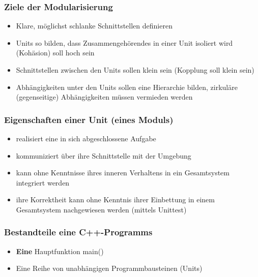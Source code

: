 \subsubsection{Ziele der Modularisierung\hfill}
\label{sec:Ziele der Modularisierung}
\begin{itemize}
	\item Klare, möglichst schlanke Schnittstellen definieren
	\item Units so bilden, dass Zusammengehörendes in einer Unit isoliert wird (Kohäsion) soll hoch sein
	\item Schnittstellen zwischen den Units sollen klein sein (Kopplung soll klein sein)
	\item Abhängigkeiten unter den Units sollen eine Hierarchie bilden, zirkuläre (gegenseitige) Abhängigkeiten müssen vermieden werden
\end{itemize}

\subsubsection{Eigenschaften einer Unit (eines Moduls)\hfill}
\label{sec:Eigenschaften einer Unit (eines Moduls)}
\begin{itemize}
	\item realisiert eine in sich abgeschlossene Aufgabe
	\item kommuniziert über ihre Schnittstelle mit der Umgebung
	\item kann ohne Kenntnisse ihres inneren Verhaltens in ein Gesamtsystem integriert werden
	\item ihre Korrektheit kann ohne Kenntnis ihrer Einbettung in einem Gesamtsystem nachgewiesen werden (mittels Unittest)
\end{itemize}

\subsubsection{Bestandteile eine C++-Programms\hfill}
\label{sec:Bestandteile eine C++-Programms}
\begin{itemize}
	\item \textbf{Eine} Hauptfunktion main()
	\item Eine Reihe von unabhängigen Programmbausteinen (Units)
\end{itemize}

